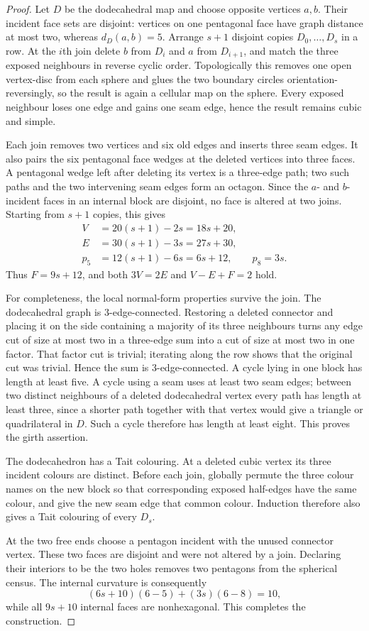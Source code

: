 \begin{proof}
Let $D$ be the dodecahedral map and choose opposite vertices $a,b$.  Their
incident face sets are disjoint: vertices on one pentagonal face have graph
distance at most two, whereas $d_D(a,b)=5$.  Arrange $s+1$ disjoint copies
$D_0,\ldots,D_s$ in a row.  At the $i$th join delete $b$ from $D_i$ and $a$
from $D_{i+1}$, and match the three exposed neighbours in reverse cyclic
order.  Topologically this removes one open vertex-disc from each sphere and
glues the two boundary circles orientation-reversingly, so the result is
again a cellular map on the sphere.  Every exposed neighbour loses one edge
and gains one seam edge, hence the result remains cubic and simple.

Each join removes two vertices and six old edges and inserts three seam
edges.  It also pairs the six pentagonal face wedges at the deleted vertices
into three faces.  A pentagonal wedge left after deleting its vertex is a
three-edge path; two such paths and the two intervening seam edges form an
octagon.  Since the $a$- and $b$-incident faces in an internal block are
disjoint, no face is altered at two joins.  Starting from $s+1$ copies, this
gives
\[
 \begin{aligned}
 V&=20(s+1)-2s=18s+20,\\
 E&=30(s+1)-3s=27s+30,\\
 p_5&=12(s+1)-6s=6s+12,\qquad p_8=3s.
 \end{aligned}
\]
Thus $F=9s+12$, and both $3V=2E$ and $V-E+F=2$ hold.

For completeness, the local normal-form properties survive the join.  The
dodecahedral graph is $3$-edge-connected.  Restoring a deleted connector and
placing it on the side containing a majority of its three neighbours turns
any edge cut of size at most two in a three-edge sum into a cut of size at
most two in one factor.  That factor cut is trivial; iterating along the row
shows that the original cut was trivial.  Hence the sum is
$3$-edge-connected.  A cycle lying in one block has length at least five.  A
cycle using a seam uses at least two seam edges; between two distinct
neighbours of a deleted dodecahedral vertex every path has length at least
three, since a shorter path together with that vertex would give a triangle
or quadrilateral in $D$.  Such a cycle therefore has length at least eight.
This proves the girth assertion.

The dodecahedron has a Tait colouring.  At a deleted cubic vertex its three
incident colours are distinct.  Before each join, globally permute the three
colour names on the new block so that corresponding exposed half-edges have
the same colour, and give the new seam edge that common colour.  Induction
therefore also gives a Tait colouring of every $D_s$.

At the two free ends choose a pentagon incident with the unused connector
vertex.  These two faces are disjoint and were not altered by a join.
Declaring their interiors to be the two holes removes two pentagons from the
spherical census.  The internal curvature is consequently
\[
       (6s+10)(6-5)+(3s)(6-8)=10,
\]
while all $9s+10$ internal faces are nonhexagonal.  This completes the
construction.
\end{proof}

